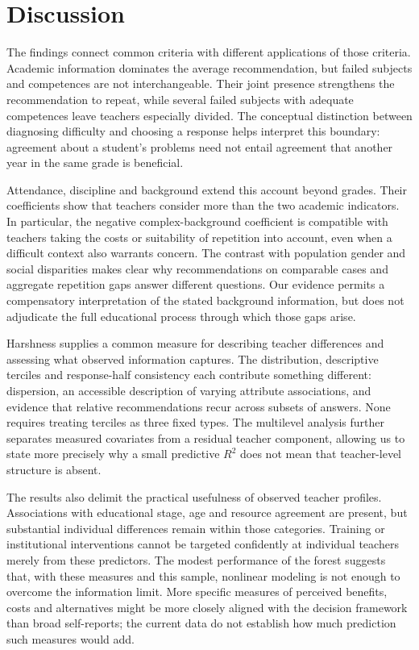 \section{Discussion}
The findings connect common criteria with different applications of those criteria. Academic information dominates the average recommendation, but failed subjects and competences are not interchangeable. Their joint presence strengthens the recommendation to repeat, while several failed subjects with adequate competences leave teachers especially divided. The conceptual distinction between diagnosing difficulty and choosing a response helps interpret this boundary: agreement about a student's problems need not entail agreement that another year in the same grade is beneficial.

Attendance, discipline and background extend this account beyond grades. Their coefficients show that teachers consider more than the two academic indicators. In particular, the negative complex-background coefficient is compatible with teachers taking the costs or suitability of repetition into account, even when a difficult context also warrants concern. The contrast with population gender and social disparities makes clear why recommendations on comparable cases and aggregate repetition gaps answer different questions. Our evidence permits a compensatory interpretation of the stated background information, but does not adjudicate the full educational process through which those gaps arise.

Harshness supplies a common measure for describing teacher differences and assessing what observed information captures. The distribution, descriptive terciles and response-half consistency each contribute something different: dispersion, an accessible description of varying attribute associations, and evidence that relative recommendations recur across subsets of answers. None requires treating terciles as three fixed types. The multilevel analysis further separates measured covariates from a residual teacher component, allowing us to state more precisely why a small predictive $R^2$ does not mean that teacher-level structure is absent.

The results also delimit the practical usefulness of observed teacher profiles. Associations with educational stage, age and resource agreement are present, but substantial individual differences remain within those categories. Training or institutional interventions cannot be targeted confidently at individual teachers merely from these predictors. The modest performance of the forest suggests that, with these measures and this sample, nonlinear modeling is not enough to overcome the information limit. More specific measures of perceived benefits, costs and alternatives might be more closely aligned with the decision framework than broad self-reports; the current data do not establish how much prediction such measures would add.

